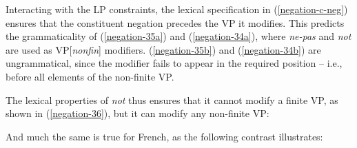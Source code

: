 \documentclass[output=paper
	        ,collection
	        ,collectionchapter
 	        ,biblatex
                ,babelshorthands
                ,newtxmath
                ,draftmode
                ,colorlinks, citecolor=brown
]{langscibook}
\begin{document}
{\begin{exe}
\begin{xlist}
\begin{exe}
\begin{xlist}
\eal
{} \label{negation-35a}
 \label{negation-35b}
\zl

\eal
{} \label{negation-34a}
 \label{negation-34b}
\zl



%

\noindent
Interacting with the LP constraints, the lexical specification
in (\ref{negation-c-neg}) ensures that the constituent negation
precedes the VP it modifies. This predicts the
grammaticality of (\ref{negation-35a}) and (\ref{negation-34a}), where \textit{ne-pas} and \textit{not} are used as VP[\textit{nonfin}] modifiers.
(\ref{negation-35b}) and (\ref{negation-34b}) are ungrammatical, since
the modifier fails to appear in the required position -- i.e.,
before all elements of the non-finite VP.

\iffalse{}
The lexical properties of \textit{not} thus ensures that it cannot
modify a finite VP, as shown  in (\ref{negation-36}), but it can modify any
non-finite VP:

\eal\label{negation-36}
\zl

\noindent And much the same is true for French, as the
following contrast illustrates:


\end{xlist}
\end{exe}
\end{xlist}
\end{exe}}
\end{document}
